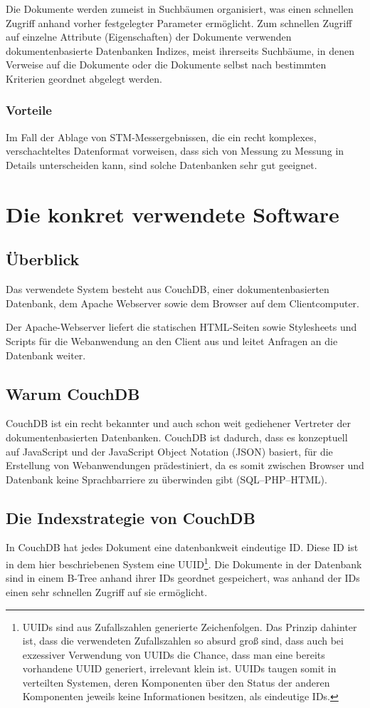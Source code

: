 \documentclass[12pt,ngerman,a4]{scrartcl}
\newcommand{\pquote}[1]{\glqq #1\grqq}
\begin{document}
Die Dokumente werden zumeist in Suchbäumen organisiert, was einen schnellen Zugriff anhand vorher festgelegter Parameter ermöglicht. Zum schnellen Zugriff auf einzelne Attribute (Eigenschaften) der Dokumente verwenden dokumentenbasierte Datenbanken Indizes, meist ihrerseits Suchbäume, in denen Verweise auf die Dokumente oder die Dokumente selbst nach bestimmten Kriterien geordnet abgelegt werden.
\subsubsection{Vorteile}
Im Fall der Ablage von STM-Messergebnissen, die ein recht komplexes, verschachteltes Datenformat vorweisen, dass sich von Messung zu Messung in Details unterscheiden kann, sind solche Datenbanken sehr gut geeignet.

\section{Die konkret verwendete Software}
\subsection{Überblick}
Das verwendete System besteht aus CouchDB, einer dokumentenbasierten Datenbank, dem Apache Webserver sowie dem Browser auf dem Clientcomputer.

Der Apache-Webserver liefert die statischen HTML-Seiten sowie Stylesheets und Scripts für die Webanwendung an den Client aus und leitet Anfragen an die Datenbank weiter.
\subsection{Warum CouchDB}
CouchDB ist ein recht bekannter und auch schon weit gediehener Vertreter der dokumentenbasierten Datenbanken. CouchDB ist dadurch, dass es konzeptuell auf JavaScript und der JavaScript Object Notation (JSON) basiert, für die Erstellung von Webanwendungen prädestiniert, da es somit zwischen Browser und Datenbank keine \pquote{Sprachbarriere} zu überwinden gibt (SQL--PHP--HTML).
\subsection{Die Indexstrategie von CouchDB}
In CouchDB hat jedes Dokument eine datenbankweit eindeutige ID. Diese ID ist in dem hier beschriebenen System eine UUID\footnote{UUIDs sind aus Zufallszahlen generierte Zeichenfolgen. Das Prinzip dahinter ist, dass die verwendeten Zufallszahlen so absurd groß sind, dass auch bei exzessiver Verwendung von UUIDs die Chance, dass man eine bereits vorhandene UUID generiert, irrelevant klein ist. UUIDs taugen somit in verteilten Systemen, deren Komponenten über den Status der anderen Komponenten jeweils keine Informationen besitzen, als eindeutige IDs.}. Die Dokumente in der Datenbank sind in einem B-Tree anhand ihrer IDs geordnet gespeichert, was anhand der IDs einen sehr schnellen Zugriff auf sie ermöglicht.
\end{document}
